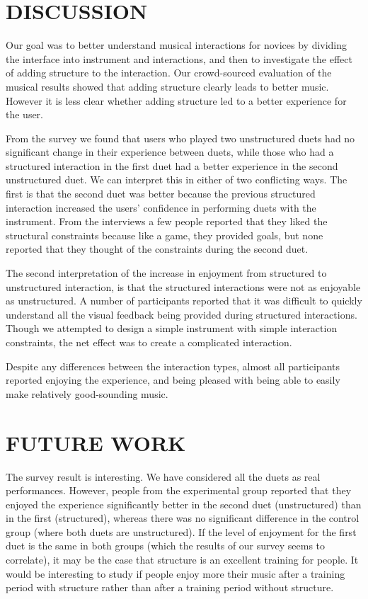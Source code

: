 \documentclass{article}
\begin{document}
\section{DISCUSSION}

Our goal was to better understand musical interactions for novices by dividing the interface into instrument and interactions, and then to investigate the effect of adding structure to the interaction.  Our crowd-sourced evaluation of the musical results showed that adding structure clearly leads to better music.  However it is less clear whether adding structure led to a better experience for the user.  

From the survey we found that users who played two unstructured duets had no significant change in their experience between duets, while those who had a structured interaction in the first duet had a better experience in the second unstructured duet. We can interpret this in either of two conflicting ways.  The first is that the second duet was better because the previous structured interaction increased the users’ confidence in performing duets with the instrument. From the interviews a few people reported that they liked the structural constraints because like a game, they provided goals, but none reported that they thought of the constraints during the second duet.

The second interpretation of the increase in enjoyment from structured to unstructured interaction, is that the structured interactions were not as enjoyable as unstructured.  A number of participants reported that it was difficult to quickly understand all the visual feedback being provided during structured interactions.  Though we attempted to design a simple instrument with simple interaction constraints, the net effect was to create a complicated interaction.

Despite any differences between the interaction types, almost all participants reported enjoying the experience, and being pleased with being able to easily make relatively good-sounding music.






\section{FUTURE WORK}

The survey result is interesting. We have considered all the duets as real performances. However, people from the experimental group reported that they enjoyed the experience significantly better in the second duet (unstructured) than in the first (structured), whereas there was no significant difference in the control group (where both duets are unstructured). If the level of enjoyment for the first duet is the same in both groups (which the results of our survey seems to correlate), it may be the case that structure is an excellent training for people. It would be interesting to study if people enjoy more their music after a training period with structure rather than after a training period without structure.
\end{document}
